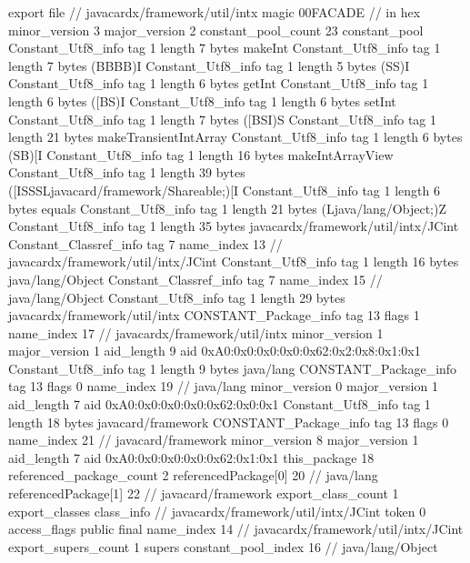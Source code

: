 export file {		// javacardx/framework/util/intx
	magic	00FACADE		 // in hex
	minor_version	3
	major_version	2
	constant_pool_count	23
	constant_pool {
		Constant_Utf8_info {
			tag	1
			length	7
			bytes	makeInt
		}
		Constant_Utf8_info {
			tag	1
			length	7
			bytes	(BBBB)I
		}
		Constant_Utf8_info {
			tag	1
			length	5
			bytes	(SS)I
		}
		Constant_Utf8_info {
			tag	1
			length	6
			bytes	getInt
		}
		Constant_Utf8_info {
			tag	1
			length	6
			bytes	([BS)I
		}
		Constant_Utf8_info {
			tag	1
			length	6
			bytes	setInt
		}
		Constant_Utf8_info {
			tag	1
			length	7
			bytes	([BSI)S
		}
		Constant_Utf8_info {
			tag	1
			length	21
			bytes	makeTransientIntArray
		}
		Constant_Utf8_info {
			tag	1
			length	6
			bytes	(SB)[I
		}
		Constant_Utf8_info {
			tag	1
			length	16
			bytes	makeIntArrayView
		}
		Constant_Utf8_info {
			tag	1
			length	39
			bytes	([ISSSLjavacard/framework/Shareable;)[I
		}
		Constant_Utf8_info {
			tag	1
			length	6
			bytes	equals
		}
		Constant_Utf8_info {
			tag	1
			length	21
			bytes	(Ljava/lang/Object;)Z
		}
		Constant_Utf8_info {
			tag	1
			length	35
			bytes	javacardx/framework/util/intx/JCint
		}
		Constant_Classref_info {
			tag	7
			name_index	13		// javacardx/framework/util/intx/JCint
		}
		Constant_Utf8_info {
			tag	1
			length	16
			bytes	java/lang/Object
		}
		Constant_Classref_info {
			tag	7
			name_index	15		// java/lang/Object
		}
		Constant_Utf8_info {
			tag	1
			length	29
			bytes	javacardx/framework/util/intx
		}
		CONSTANT_Package_info {
			tag	13
			flags	1
			name_index	17		// javacardx/framework/util/intx
			minor_version	1
			major_version	1
			aid_length	9
			aid	0xA0:0x0:0x0:0x0:0x62:0x2:0x8:0x1:0x1
		}
		Constant_Utf8_info {
			tag	1
			length	9
			bytes	java/lang
		}
		CONSTANT_Package_info {
			tag	13
			flags	0
			name_index	19		// java/lang
			minor_version	0
			major_version	1
			aid_length	7
			aid	0xA0:0x0:0x0:0x0:0x62:0x0:0x1
		}
		Constant_Utf8_info {
			tag	1
			length	18
			bytes	javacard/framework
		}
		CONSTANT_Package_info {
			tag	13
			flags	0
			name_index	21		// javacard/framework
			minor_version	8
			major_version	1
			aid_length	7
			aid	0xA0:0x0:0x0:0x0:0x62:0x1:0x1
		}
	}
	this_package	18
	referenced_package_count	2
	referencedPackage[0]	20		// java/lang
	referencedPackage[1]	22		// javacard/framework
	export_class_count	1
	export_classes {
		class_info {		// javacardx/framework/util/intx/JCint
			token	0
			access_flags	public final
			name_index	14		// javacardx/framework/util/intx/JCint
			export_supers_count	1
			supers {
				constant_pool_index	16		// java/lang/Object
}}}}
